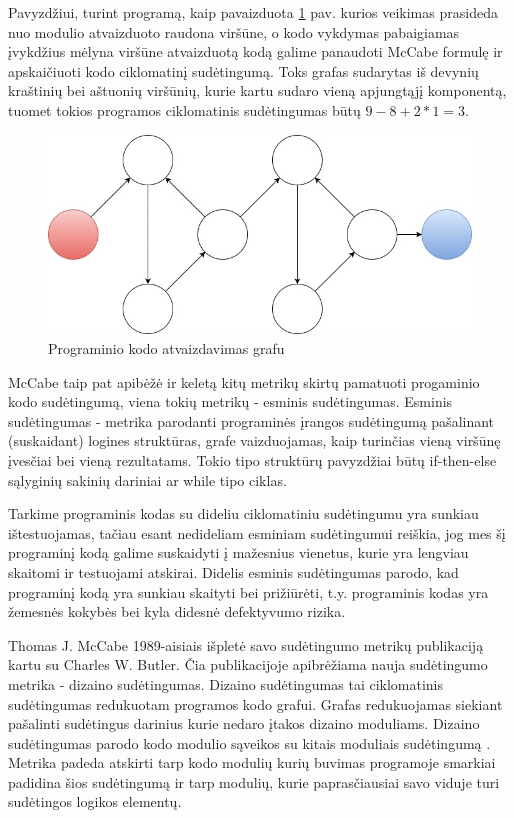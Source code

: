 \documentclass{VUMIFPSbakalaurinis}
\begin{document}
Pavyzdžiui, turint programą, kaip pavaizduota \ref{img:Cyclomatic_graph_1} pav. kurios veikimas prasideda nuo modulio atvaizduoto raudona viršūne, o kodo vykdymas pabaigiamas įvykdžius mėlyna viršūne atvaizduotą kodą galime panaudoti McCabe formulę ir apskaičiuoti kodo ciklomatinį sudėtingumą. Toks grafas sudarytas iš devynių kraštinių bei aštuonių viršūnių, kurie kartu sudaro vieną apjungtąjį komponentą, tuomet tokios programos ciklomatinis sudėtingumas būtų \(9 - 8 + 2 * 1 = 3\).

\begin{figure}[H]
    \centering
    \includegraphics[scale=0.6]{img/Cyclomatic_graph_1}
    \caption{Programinio kodo atvaizdavimas grafu}
    \label{img:Cyclomatic_graph_1}
\end{figure}

McCabe taip pat apibėžė ir keletą kitų metrikų skirtų pamatuoti progaminio kodo sudėtingumą, viena tokių metrikų - esminis sudėtingumas. Esminis sudėtingumas - metrika parodanti programinės įrangos sudėtingumą pašalinant (suskaidant) logines struktūras, grafe vaizduojamas, kaip turinčias vieną viršūnę įvesčiai bei vieną rezultatams. Tokio tipo struktūrų pavyzdžiai būtų if-then-else sąlyginių sakinių dariniai ar while tipo ciklas.

Tarkime programinis kodas su dideliu ciklomatiniu sudėtingumu yra sunkiau ištestuojamas, tačiau esant nedideliam esminiam sudėtingumui reiškia, jog mes šį programinį kodą galime suskaidyti į mažesnius vienetus, kurie yra lengviau skaitomi ir testuojami atskirai. Didelis esminis sudėtingumas parodo, kad programinį kodą yra sunkiau skaityti bei prižiūrėti, t.y. programinis kodas yra žemesnės kokybės bei kyla didesnė defektyvumo rizika.

Thomas J. McCabe 1989-aisiais išpletė savo sudėtingumo metrikų publikaciją kartu su Charles W. Butler. Čia publikacijoje apibrėžiama nauja sudėtingumo metrika - dizaino sudėtingumas. Dizaino sudėtingumas tai ciklomatinis sudėtingumas redukuotam programos kodo grafui. Grafas redukuojamas siekiant pašalinti sudėtingus darinius kurie nedaro įtakos dizaino moduliams. Dizaino sudėtingumas parodo kodo modulio sąveikos su kitais moduliais sudėtingumą \cite{McCabe:1989:DCM:76380.76382}. Metrika padeda atskirti tarp kodo modulių kurių buvimas programoje smarkiai padidina šios sudėtingumą ir tarp modulių, kurie paprasčiausiai savo viduje turi sudėtingos logikos elementų.
\end{document}
